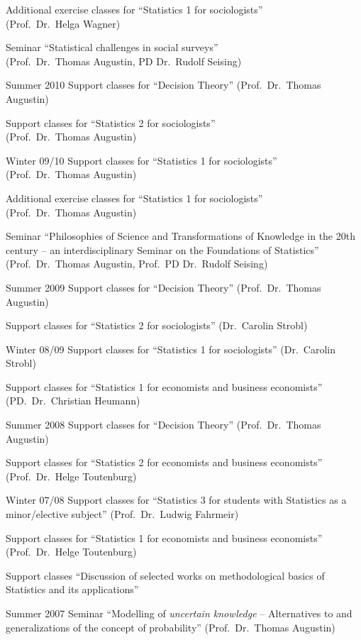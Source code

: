 \documentclass[a4paper]{simplecv}
\begin{document}
\begin{topic}
                    Additional exercise classes for ``Statistics 1 for sociologists''\\ (Prof.\ Dr.\ Helga Wagner)

                    Seminar ``Statistical challenges in social surveys''\\ (Prof.\ Dr.\ Thomas Augustin, PD Dr.\ Rudolf Seising)

\item[Summer 2010]  Support classes for ``Decision Theory'' (Prof.\ Dr.\ Thomas Augustin)

                    Support classes for ``Statistics 2 for sociologists''\\ (Prof.\ Dr.\ Thomas Augustin)

\item[Winter 09/10] Support classes for ``Statistics 1 for sociologists''\\ (Prof.\ Dr.\ Thomas Augustin)

                    Additional exercise classes for ``Statistics 1 for sociologists''\\ (Prof.\ Dr.\ Thomas Augustin)

                    Seminar ``Philosophies of Science and Transformations of Knowledge in the 20th century -- an interdisciplinary Seminar on the Foundations of Statistics''
                    (Prof.\ Dr.\ Thomas Augustin, Prof.\ PD Dr.\ Rudolf Seising)

\item[Summer 2009]  Support classes for ``Decision Theory'' (Prof.\ Dr.\ Thomas Augustin)

                    Support classes for ``Statistics 2 for sociologists'' (Dr.\ Carolin Strobl)

\item[Winter 08/09] Support classes for ``Statistics 1 for sociologists'' (Dr.\ Carolin Strobl)

                    Support classes for ``Statistics 1 for economists and business economists'' (PD.\ Dr.\ Christian Heumann)

\item[Summer 2008]  Support classes for ``Decision Theory'' (Prof.\ Dr.\ Thomas Augustin)

                    Support classes for ``Statistics 2 for economists and business economists'' (Prof.\ Dr.\ Helge Toutenburg)

\item[Winter 07/08] Support classes for ``Statistics 3 for students with Statistics as a minor/elective subject'' (Prof.\ Dr.\ Ludwig Fahrmeir)

                    Support classes for ``Statistics 1 for economists and business economists'' (Prof.\ Dr.\ Helge Toutenburg)

                    Support classes ``Discussion of selected works on methodological basics of Statistics and its applications''

\item[Summer 2007]  Seminar ``Modelling of \emph{uncertain knowledge} -- Alternatives to and generalizations of the concept of probability'' (Prof.\ Dr.\ Thomas Augustin)
\end{topic}
\end{document}

